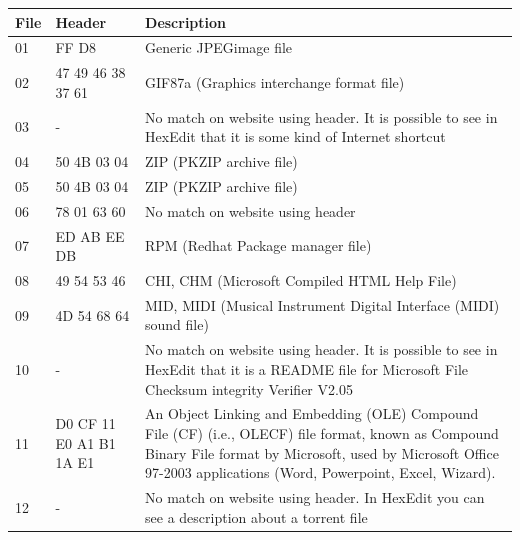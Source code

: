 \documentclass[a4paper,10pt,oneside]{article}
\begin{document}
\begin{center}
        \begin{tabular}{|l|l|p{5cm}|}
                \hline
                \textbf{File} & \textbf{Header} & \textbf{Description} \\ \hline
                01 & FF D8 & Generic JPEGimage file \\ \hline
                02 & 47 49 46 38 37 61 & GIF87a (Graphics interchange format file) \\ \hline
                03 & - & No match on website using header. It is possible to see in HexEdit that it is some kind of Internet shortcut \\ \hline
                04 & 50 4B 03 04 & ZIP (PKZIP archive file) \\ \hline
                05 & 50 4B 03 04 & ZIP (PKZIP archive file) \\ \hline
                06 & 78 01 63 60 & No match on website using header \\ \hline
                07 & ED AB EE DB & RPM (Redhat Package manager file) \\ \hline
                08 & 49 54 53 46 & CHI, CHM (Microsoft Compiled HTML Help File) \\ \hline
                09 & 4D 54 68 64 & MID, MIDI (Musical Instrument Digital Interface (MIDI) sound file) \\ \hline
                10 & - & No match on website using header. It is possible to see in HexEdit that it is a README file for Microsoft File Checksum integrity Verifier V2.05 \\ \hline
                11 & D0 CF 11 E0 A1 B1 1A E1 & An Object Linking and Embedding (OLE) Compound File (CF) (i.e., OLECF) file format, known as Compound Binary File format by Microsoft, used by Microsoft Office 97-2003 applications (Word, Powerpoint, Excel, Wizard). \\ \hline
                12 & - & No match on website using header. In HexEdit you can see a description about a torrent file \\ \hline
        \end{tabular}
\end{center}
\end{document}
